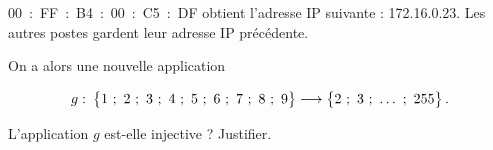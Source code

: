 \documentclass[a4paper,12pt,french]{book}
\begin{document}
\begin{exercice}[]
\begin{enumerate}[\bfseries 1.]
	00~:~FF~:~B4~:~00~:~C5~:~DF obtient l'adresse IP suivante : 172.16.0.23. Les autres postes gardent leur adresse IP précédente.

	On a alors une nouvelle application


	\[g : \:\left\lbrace 1~;~2~;~3~;~4~;~5~;~6~;~7~;~8~;~9\rule{0pt}{9pt}\right\rbrace \longrightarrow\left\lbrace 2~;~3~;~\ldots~;~255\rule{0pt}{9pt}\right\rbrace.\]

	L'application $g$  est-elle injective ? Justifier.\\
\end{enumerate}
\end{exercice}
\end{document}
